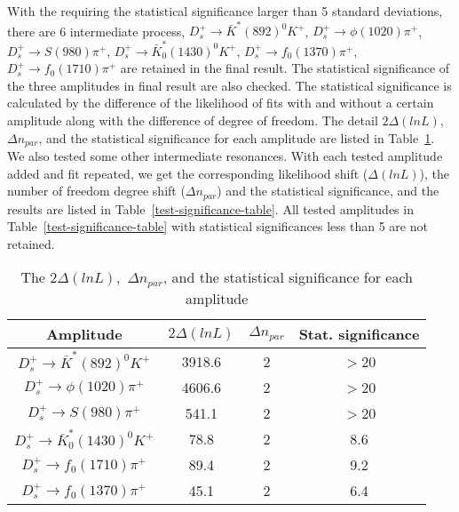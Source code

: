{With the requiring the statistical significance larger than 5 standard deviations, there are 6 intermediate process, 
$D_{s}^{+} \rightarrow \bar{K}^{*}(892)^{0}K^{+}$,
$D_{s}^{+} \rightarrow \phi(1020)\pi^{+}$,
$D_{s}^{+} \rightarrow S(980)\pi^{+}$,
$D_{s}^{+} \rightarrow \bar{K}^{*}_{0}(1430)^{0}K^{+}$,
$D_{s}^{+} \rightarrow f_{0}(1370)\pi^{+}$,
$D_{s}^{+} \rightarrow f_{0}(1710)\pi^{+}$ 
are retained in the final result. The statistical significance of the three amplitudes in final result are also checked.
The statistical significance is calculated by the difference of the likelihood of fits with and without a certain amplitude along with the difference of degree of freedom.
The detail $2\Delta(lnL)$, $\Delta n_{par}$, and the statistical significance for each amplitude are  listed in Table~\ref{significance-table}.
We also tested some other intermediate resonances. With each tested amplitude added and fit repeated, we get the corresponding likelihood shift ($\Delta(lnL)$), the number of freedom degree shift ($\Delta n_{par}$) and the statistical significance, and the results are listed in Table~\ref{test-significance-table}.
All tested amplitudes in Table~\ref{test-significance-table}  with statistical significances less than 5 are not retained. 
\begin{table}[htbp]
    \caption{The $2\Delta(lnL)$,~$\Delta n_{par}$, and the statistical significance for each amplitude}
    \label{significance-table}
    \begin{center}
        \begin{tabular}{cccc}
            \toprule
            Amplitude & $2\Delta(lnL)$ & $\Delta n_{par}$ & Stat. significance\\
            \hline
            $D_{s}^{+} \rightarrow \bar{K}^{*}(892)^{0}K^{+}$              & 3918.6     & 2   & $>$20\\
            $D_{s}^{+} \rightarrow \phi(1020)\pi^{+}$                      & 4606.6     & 2   & $>$20\\
            $D_{s}^{+} \rightarrow S(980)\pi^{+}$                           & 541.1      & 2   & $>$20\\
            $D_{s}^{+} \rightarrow \bar{K}^{*}_{0}(1430)^{0}K^{+}$         & 78.8       & 2   & 8.6\\
            $D_{s}^{+} \rightarrow f_{0}(1710)\pi^{+}$                     & 89.4       & 2   & 9.2\\
            $D_{s}^{+} \rightarrow f_{0}(1370)\pi^{+}$                     & 45.1       & 2   & 6.4\\
            \bottomrule
        \end{tabular}
    \end{center}
\end{table}

}
